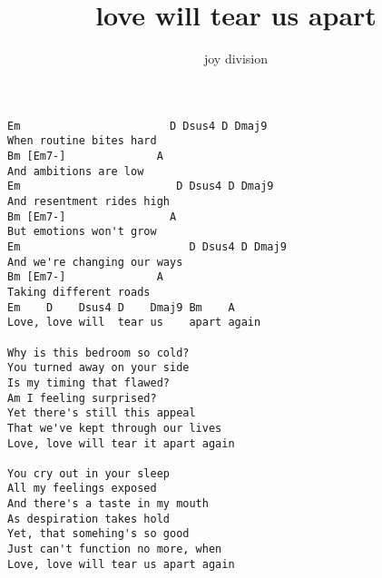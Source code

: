 \author{joy division}
\title{love will tear us apart}
\maketitle
\begin{verbatim}
Em                       D Dsus4 D Dmaj9
When routine bites hard
Bm [Em7-]              A
And ambitions are low
Em                        D Dsus4 D Dmaj9
And resentment rides high
Bm [Em7-]                A
But emotions won't grow
Em                          D Dsus4 D Dmaj9
And we're changing our ways
Bm [Em7-]              A
Taking different roads
Em    D    Dsus4 D    Dmaj9 Bm    A
Love, love will  tear us    apart again

Why is this bedroom so cold?
You turned away on your side
Is my timing that flawed?
Am I feeling surprised?
Yet there's still this appeal
That we've kept through our lives
Love, love will tear it apart again

You cry out in your sleep
All my feelings exposed
And there's a taste in my mouth
As despiration takes hold
Yet, that somehing's so good
Just can't function no more, when
Love, love will tear us apart again
\end{verbatim}